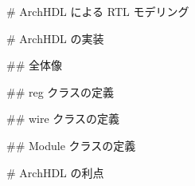 # ArchHDL による RTL モデリング







# ArchHDL の実装









## 全体像







## reg クラスの定義





## wire クラスの定義





## Module クラスの定義







# ArchHDL の利点





